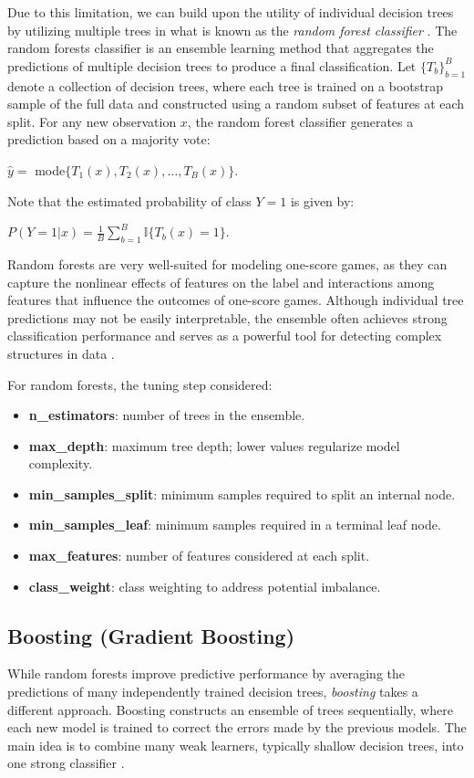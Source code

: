 \documentclass[11pt]{amsart}
\theoremstyle{definition}                  %
\theoremstyle{remark}                       %
\numberwithin{equation}{section}
\begin{document}
Due to this limitation, we can build upon the utility of individual decision trees by utilizing multiple trees in what is known as the \textit{random forest classifier} \cite{hastie2009elements,james2021introduction}. The random forests classifier is an ensemble learning method that aggregates the predictions of multiple decision trees to produce a final classification. Let $\{T_b\}_{b=1}^B$ denote a collection of decision trees, where each tree is trained on a bootstrap sample of the full data and constructed using a random subset of features at each split. For any new observation $x$, the random forest classifier generates a prediction based on a majority vote:
\begin{center}
    $\hat{y} = $ mode$ \{T_1(x), T_2(x), \dots, T_B(x)\}$.
\end{center}
Note that the estimated probability of class $Y = 1$ is given by: 
\begin{center}
    $P(Y = 1 | x) = \frac{1}{B}\sum\limits_{b=1}^B\mathbb{I}\{T_b(x) = 1\}$.
\end{center}
Random forests are very well-suited for modeling one-score games, as they can capture the nonlinear effects of features on the label and interactions among features that influence the outcomes of one-score games. Although individual tree predictions may not be easily interpretable, the ensemble often achieves strong classification performance and serves as a powerful tool for detecting complex structures in data \cite{breiman2001random,hastie2009elements}.

For random forests, the tuning step considered:
\begin{itemize}
    \item \textbf{n\_estimators}: number of trees in the ensemble.
    \item \textbf{max\_depth}: maximum tree depth; lower values regularize model complexity.
    \item \textbf{min\_samples\_split}: minimum samples required to split an internal node.
    \item \textbf{min\_samples\_leaf}: minimum samples required in a terminal leaf node.
    \item \textbf{max\_features}: number of features considered at each split.
    \item \textbf{class\_weight}: class weighting to address potential imbalance.
\end{itemize}

\subsection{Boosting (Gradient Boosting)}
While random forests improve predictive performance by averaging the predictions of many independently trained decision trees, \textit{boosting} takes a different approach. Boosting constructs an ensemble of trees sequentially, where each new model is trained to correct the errors made by the previous models. The main idea is to combine many weak learners, typically shallow decision trees, into one strong classifier \cite{friedman2001greedy}.
\end{document}
